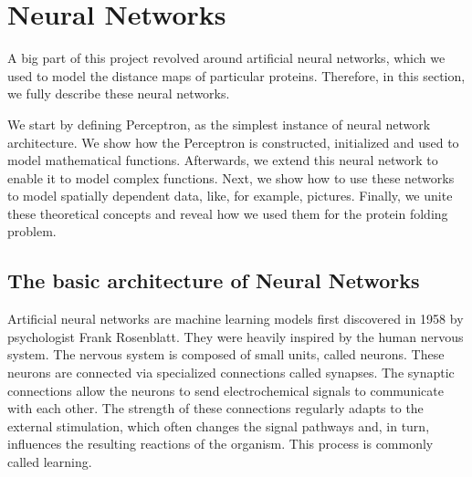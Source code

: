 \newpage
\section{Neural Networks}
A big part of this project revolved around artificial neural networks, which we used to model the distance maps of particular proteins. 
Therefore, in this section, we fully describe these neural networks.

We start by defining Perceptron, as the simplest instance of neural network architecture.
We show how the Perceptron is constructed, initialized and used to model mathematical functions.
Afterwards, we extend this neural network to enable it to model complex functions.
Next, we show how to use these networks to model spatially dependent data, like, for example, pictures.
Finally, we unite these theoretical concepts and reveal how we used them for the protein folding problem.






\subsection{The basic architecture of Neural Networks}
Artificial neural networks are machine learning models first discovered in 1958 by psychologist Frank Rosenblatt.
They were heavily inspired by the human nervous system.
The nervous system is composed of small units, called neurons.
These neurons are connected via specialized connections called synapses.
The synaptic connections allow the neurons to send electrochemical signals to communicate with each other.
The strength of these connections regularly adapts to the external stimulation, which often changes the signal pathways and, in turn, influences the resulting reactions of the organism.
This process is commonly called learning.

